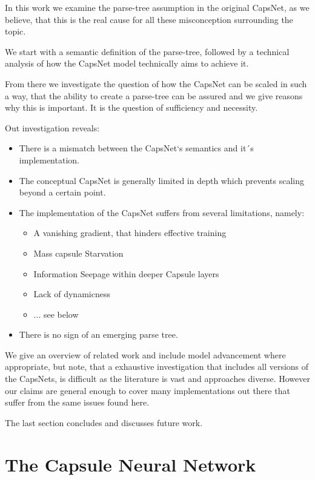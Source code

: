 \documentclass{article}
\begin{document}

In this work we examine the parse-tree assumption in the original CapsNet, as we believe, that this is the real cause for all these misconception surrounding the topic.

We start with a semantic definition of the parse-tree, followed by a technical analysis of how the CapsNet model technically aims to achieve it.

From there we investigate the question of how the CapsNet can be scaled in such a way, that the ability to create a parse-tree can be assured and we give reasons why this is important.
It is the question of sufficiency and necessity.

Out investigation reveals:
\begin{itemize}
	\item There is a mismatch between the CapsNet`s semantics and it´s implementation.
	\item The conceptual CapsNet is generally limited in depth which prevents scaling beyond a certain point.
	\item The implementation of the CapsNet suffers from several limitations, namely:
	\begin{itemize}
		\item A vanishing gradient, that hinders effective training
		\item Mass capsule Starvation
		\item Information Seepage within deeper Capsule layers
		\item Lack of dynamicness
		\item ... see below
	\end{itemize}
	\item There is no sign of an emerging parse tree.
\end{itemize}

We give an overview of related work and include model advancement where appropriate, but note, that a exhaustive investigation that includes all versions of the CapsNets, is difficult as the literature is vast and approaches diverse. However our claims are general enough to cover many implementations out there that suffer from the same issues found here.

The last section concludes and discusses future work.

\section{The Capsule Neural Network}
\end{document}
